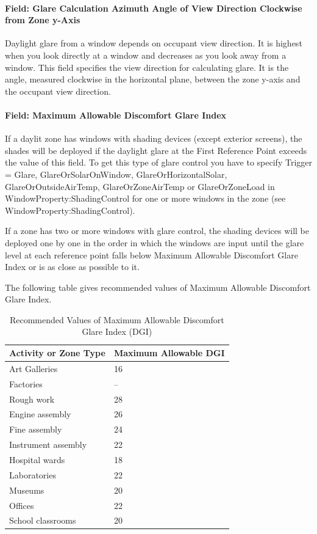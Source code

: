 \paragraph{Field: Glare Calculation Azimuth Angle of View Direction Clockwise from Zone y-Axis}\label{field-glare-calculation-azimuth-angle-of-view-direction-clockwise-from-zone-y-axis}

Daylight glare from a window depends on occupant view direction. It is highest when you look directly at a window and decreases as you look away from a window. This field specifies the view direction for calculating glare. It is the angle, measured clockwise in the horizontal plane, between the zone y-axis and the occupant view direction.

\paragraph{Field: Maximum Allowable Discomfort Glare Index}\label{field-maximum-allowable-discomfort-glare-index}

If a daylit zone has windows with shading devices (except exterior screens), the shades will be deployed if the daylight glare at the First Reference Point exceeds the value of this field. To get this type of glare control you have to specify Trigger = Glare, GlareOrSolarOnWindow, GlareOrHorizontalSolar, GlareOrOutsideAirTemp, GlareOrZoneAirTemp or GlareOrZoneLoad in WindowProperty:ShadingControl for one or more windows in the zone (see WindowProperty:ShadingControl).

If a zone has two or more windows with glare control, the shading devices will be deployed one by one in the order in which the windows are input until the glare level at each reference point falls below Maximum Allowable Discomfort Glare Index or is as close as possible to it.

The following table gives recommended values of Maximum Allowable Discomfort Glare Index.

\begin{longtable}[c]{p{3.64in}p{2.35in}}
  \caption{Recommended Values of Maximum Allowable Discomfort Glare Index (DGI) \protect \label{table:recommended-values-discomfort-glare-index}}\\
\toprule 
Activity or Zone Type & Maximum Allowable DGI \tabularnewline \midrule
\endhead
Art Galleries & 16 \tabularnewline
Factories & -- \tabularnewline
Rough work & 28 \tabularnewline
Engine assembly & 26 \tabularnewline
Fine assembly & 24 \tabularnewline
Instrument assembly & 22 \tabularnewline
Hospital wards & 18 \tabularnewline
Laboratories & 22 \tabularnewline
Museums & 20 \tabularnewline
Offices & 22 \tabularnewline
School classrooms & 20 \tabularnewline
\bottomrule
\end{longtable}

